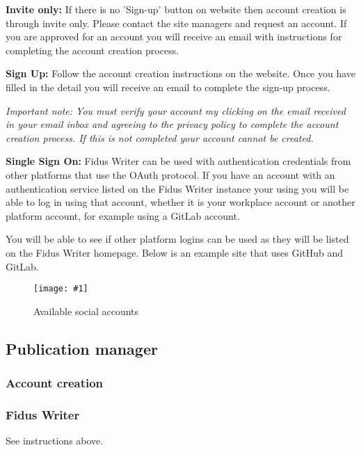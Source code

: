 \documentclass{article}
\newlength{\imgwidth}
\newcommand\scaledgraphics[2]{%
                
\settowidth{\imgwidth}{\texttt{[image: \#1]}}%
                
\setlength{\imgwidth}{\minof{\imgwidth}{#2\textwidth}}%
                
\texttt{[image: \#1]}%
                
}
\begin{document}
\textbf{Invite only:} If there is no 'Sign-up' button on website then account creation is through invite only. Please contact the site managers and request an account. If you are approved for an account you will receive an email with instructions for completing the account creation process.


\textbf{Sign Up:} Follow the account creation instructions on the website. Once you have filled in the detail you will receive an email to complete the sign-up process.


\emph{Important note: You must verify your account my clicking on the email received in your email inbox and agreeing to the privacy policy to complete the account creation process. If this is not completed your account cannot be created.}


\textbf{Single Sign On:} Fidus Writer can be used with authentication credentials from other platforms that use the OAuth protocol. If you have an account with an authentication service listed on the Fidus Writer instance your using you will be able to log in using that account, whether it is your workplace account or another platform account, for example using a GitLab account.  


You will be able to see if other platform logins can be used as they will be listed on the Fidus Writer homepage. Below is an example site that uses GitHub and GitLab.

\begin{figure}
\scaledgraphics{71699460-57ed-4235-9586-40bec33cc8f8.png}{1}
\caption*{Available social accounts}\label{F93200321}
\end{figure}


\subsection{Publication manager}\label{H7576515}



\subsubsection{Account creation}\label{H5792718}



\subsubsection{Fidus Writer}\label{H8503334}



See instructions above.
\end{document}

